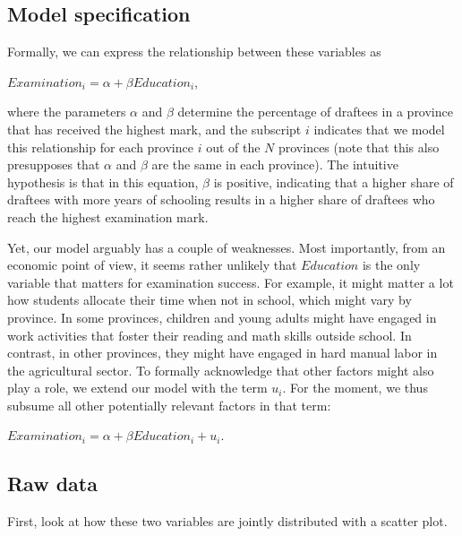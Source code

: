 \documentclass[
  12pt,
]{style/krantz}
\newenvironment{Shaded}{\begin{snugshade}}{\end{snugshade}}
\newcommand{\FunctionTok}[1]{\textcolor[rgb]{0.00,0.00,0.00}{#1}}
\newcommand{\NormalTok}[1]{#1}
\newcommand{\SpecialCharTok}[1]{\textcolor[rgb]{0.00,0.00,0.00}{#1}}
\begin{document}
\hypertarget{model-specification}{%
\subsection{Model specification}\label{model-specification}}

Formally, we can express the relationship between these variables as

\(Examination_{i}= \alpha + \beta Education_{i}\),

where the parameters \(\alpha\) and \(\beta\) determine the percentage of draftees in a province that has received the highest mark, and the subscript \(i\) indicates that we model this relationship for each province \(i\) out of the \(N\) provinces (note that this also presupposes that \(\alpha\) and \(\beta\) are the same in each province). The intuitive hypothesis is that in this equation, \(\beta\) is positive, indicating that a higher share of draftees with more years of schooling results in a higher share of draftees who reach the highest examination mark.

Yet, our model arguably has a couple of weaknesses. Most importantly, from an economic point of view, it seems rather unlikely that \(Education\) is the only variable that matters for examination success. For example, it might matter a lot how students allocate their time when not in school, which might vary by province. In some provinces, children and young adults might have engaged in work activities that foster their reading and math skills outside school. In contrast, in other provinces, they might have engaged in hard manual labor in the agricultural sector. To formally acknowledge that other factors might also play a role, we extend our model with the term \(u_{i}\). For the moment, we thus subsume all other potentially relevant factors in that term:

\(Examination_{i}= \alpha + \beta Education_{i} + u_{i}\).

\hypertarget{raw-data}{%
\subsection{Raw data}\label{raw-data}}

First, look at how these two variables are jointly distributed with a scatter plot.

\begin{Shaded}
\end{Shaded}
\end{document}
